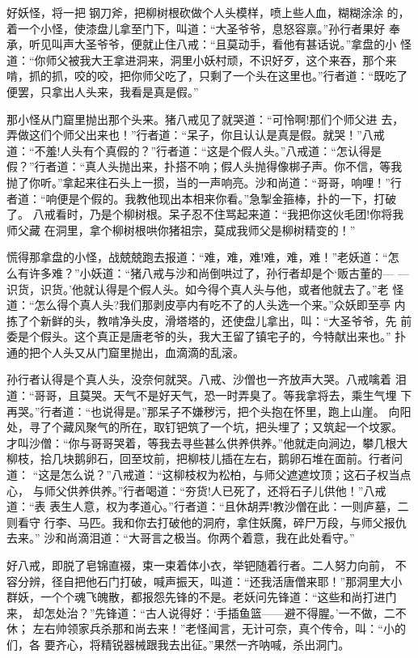好妖怪，将一把钢刀斧，把柳树根砍做个人头模样，喷上些人血，糊糊涂涂
的，着一个小怪，使漆盘儿拿至门下，叫道：“大圣爷爷，息怒容禀。”孙行者果好
奉承，听见叫声大圣爷爷，便就止住八戒：“且莫动手，看他有甚话说。”拿盘的小
怪道：“你师父被我大王拿进洞来，洞里小妖村顽，不识好歹，这个来吞，那个来
啃，抓的抓，咬的咬，把你师父吃了，只剩了一个头在这里也。”行者道：“既吃了
便罢，只拿出人头来，我看是真是假。”

那小怪从门窟里抛出那个头来。猪八戒见了就哭道：“可怜啊!那们个师父进
去，弄做这们个师父出来也！”行者道：“呆子，你且认认是真是假。就哭！”八戒
道：“不羞!人头有个真假的？”行者道：“这是个假人头。”八戒道：“怎认得是
假？”行者道：“真人头抛出来，扑搭不响；假人头抛得像梆子声。你不信，等我
抛了你听。”拿起来往石头上一掼，当的一声响亮。沙和尚道：“哥哥，响哩！”行
者道：“响便是个假的。我教他现出本相来你看。”急掣金箍棒，扑的一下，打破了。
八戒看时，乃是个柳树根。呆子忍不住骂起来道：“我把你这伙毛团!你将我师父藏
在洞里，拿个柳树根哄你猪祖宗，莫成我师父是柳树精变的！”

慌得那拿盘的小怪，战兢兢跑去报道：“难，难，难!难，难，难！”老妖道：“怎
么有许多难？”小妖道：“猪八戒与沙和尚倒哄过了，孙行者却是个‘贩古董的—
—识货，识货。’他就认得是个假人头。如今得个真人头与他，或者他就去了。”老
怪道：“怎么得个真人头?我们那剥皮亭内有吃不了的人头选一个来。”众妖即至亭
内拣了个新鲜的头，教啃净头皮，滑塔塔的，还使盘儿拿出，叫：“大圣爷爷，先
前委是个假头。这个真正是唐老爷的头，我大王留了镇宅子的，今特献出来也。”
扑通的把个人头又从门窟里抛出，血滴滴的乱滚。

孙行者认得是个真人头，没奈何就哭。八戒、沙僧也一齐放声大哭。八戒噙着
泪道：“哥哥，且莫哭。天气不是好天气，恐一时弄臭了。等我拿将去，乘生气埋
下再哭。”行者道：“也说得是。”那呆子不嫌秽污，把个头抱在怀里，跑上山崖。
向阳处，寻了个藏风聚气的所在，取钉钯筑了一个坑，把头埋了；又筑起一个坟冢。
才叫沙僧：“你与哥哥哭着，等我去寻些甚么供养供养。”他就走向涧边，攀几根大
柳枝，拾几块鹅卵石，回至坟前，把柳枝儿插在左右，鹅卵石堆在面前。行者问道：
“这是怎么说？”八戒道：“这柳枝权为松柏，与师父遮遮坟顶；这石子权当点心，
与师父供养供养。”行者喝道：“夯货!人已死了，还将石子儿供他！”八戒道：“表
表生人意，权为孝道心。”行者道：“且休胡弄!教沙僧在此：一则庐墓，二则看守
行李、马匹。我和你去打破他的洞府，拿住妖魔，碎尸万段，与师父报仇去来。”
沙和尚滴泪道：“大哥言之极当。你两个着意，我在此处看守。”

好八戒，即脱了皂锦直裰，束一束着体小衣，举钯随着行者。二人努力向前，
不容分辨，径自把他石门打破，喊声振天，叫道：“还我活唐僧来耶！”那洞里大小
群妖，一个个魂飞魄散，都报怨先锋的不是。老妖问先锋道：“这些和尚打进门来，
却怎处治？”先锋道：“古人说得好：‘手插鱼篮——避不得腥。’一不做，二不休；
左右帅领家兵杀那和尚去来！”老怪闻言，无计可奈，真个传令，叫：“小的们，各
要齐心，将精锐器械跟我去出征。”果然一齐呐喊，杀出洞门。

